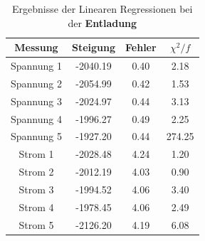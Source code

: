 \documentclass[12pt,a4paper]{article}
\begin{document}
\begin{table}
\begin{center}
\begin{tabular}{|c|c|c|c|}
\hline 
Messung & Steigung & Fehler & $\chi ^{2}/f$ \\ 
\hline 
Spannung 1 & -2040.19 & 0.40 & 2.18 \\ 
\hline 
Spannung 2 & -2054.99 & 0.42 & 1.53 \\ 
\hline 
Spannung 3 & -2024.97 & 0.44 & 3.13 \\ 
\hline 
Spannung 4 & -1996.27 & 0.49 & 2.25 \\ 
\hline 
Spannung 5 & -1927.20 & 0.44 & 274.25 \\ 
\hline 
\hline
Strom 1 & -2028.48 & 4.24 & 1.20 \\ 
\hline 
Strom 2 & -2012.19 & 4.03 & 0.90 \\ 
\hline 
Strom 3 & -1994.52 & 4.06 & 3.40 \\ 
\hline 
Strom 4 & -1978.45 & 4.06 & 2.49 \\ 
\hline 
Strom 5 & -2126.20 & 4.19 & 6.08 \\ 
\hline 
\end{tabular} 
\end{center}
\label{tab:kond_linreg2} 
\caption{Ergebnisse der Linearen Regressionen bei der \textbf{Entladung}}
\end{table}
\newpage
\end{document}
